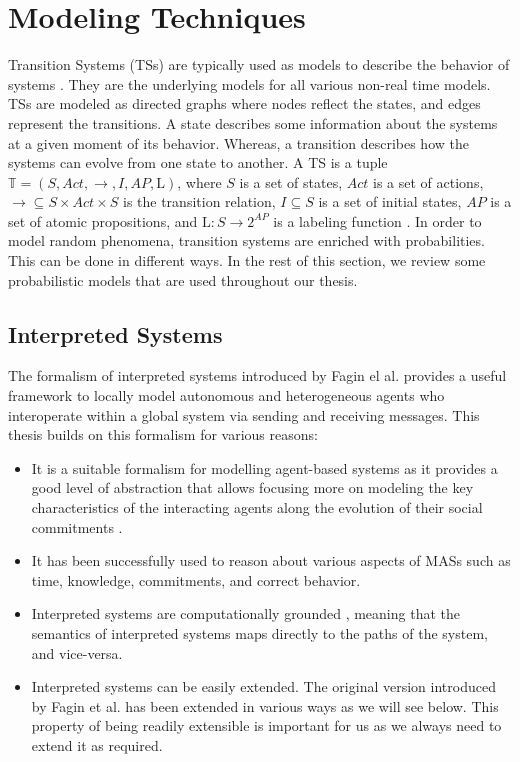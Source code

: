 \section{Modeling Techniques} \label{sec:system-models-cha2}
Transition Systems (TSs) are typically used as models to describe the behavior of systems \cite{Clarke1999}. They are the underlying models for all various non-real time models. TSs are modeled as directed graphs where nodes reflect the states, and edges represent the transitions. A state describes some information about the systems at a given moment of its behavior. Whereas, a transition describes how the systems can evolve from one state to another. A TS is a tuple $\mathbb{T} =(S, Act, \rightarrow, I, AP, \mathrm{L})$, where $S$ is a set of states, $Act$ is a set of actions, $\rightarrow\subseteq S\times Act \times S$ is the transition relation, $I\subseteq S$ is a set of initial states, $AP$ is a set of atomic propositions, and $\mathrm{L}: S \to 2^{AP}$ is a labeling function \cite{Baier2008}. %
In order to model random phenomena, transition systems are enriched with probabilities. This can be done in different ways. In the rest of this section, we review some probabilistic models that are used throughout our thesis.

\subsection{Interpreted Systems} \label{interpreted-systems-cha2}

The formalism of interpreted systems introduced by Fagin el al. \cite{Fagin1995} provides a useful framework to locally
model autonomous and heterogeneous agents who interoperate within
a global system via sending and receiving messages. This thesis builds on this formalism for various reasons:

\begin{itemize}
\item It is a suitable formalism for modelling agent-based systems as it provides a good level of abstraction that allows focusing more on modeling the key characteristics of the interacting agents along the evolution of their social commitments \cite{El-Menshawy2012}.
\item It has been successfully used to reason about various aspects of MASs such as time, knowledge, commitments, and correct behavior.
\item Interpreted systems are computationally grounded \cite{Wooldridge2000b}, meaning that the semantics of interpreted systems maps directly to the paths of the system, and vice-versa.
\item Interpreted systems can be easily extended. The original version introduced by Fagin et al. \cite{Fagin1995} has been extended in various ways as we will see below. This property of being readily extensible is important for us as we always need to extend it as required.
\end{itemize}

